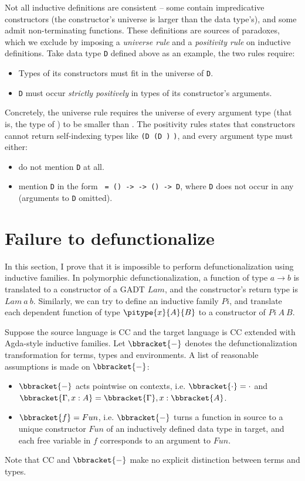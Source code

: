 Not all inductive definitions are consistent -- some contain impredicative constructors (the constructor's universe is larger than the data type's), and some admit non-terminating functions. These definitions are sources of paradoxes, which we exclude by imposing a \textit{universe rule} and a \textit{positivity rule} on inductive definitions. Take data type \texttt{D} defined above as an example, the two rules require:
\begin{itemize}
  \item Types of its constructors must fit in the universe of \texttt{D}.
  \item \texttt{D} must occur \textit{strictly positively} in types of its constructor's arguments.
\end{itemize}

Concretely, the universe rule requires the universe of every argument type  (that is, the type of ) to be smaller than . The positivity rules states that constructors cannot return self-indexing types like \texttt{(D (D \codedots )} \texttt{\codedots )}, and every argument type  must either:
\begin{itemize}
  \item do not mention \texttt{D} at all.
  \item mention \texttt{D} in the form \texttt{ = () -> \codemath{\cdots} -> () -> D}, where \texttt{D} does not occur in any  (arguments to \texttt{D} omitted).
\end{itemize}

\section{Failure to defunctionalize}

In this section, I prove that it is impossible to perform defunctionalization using inductive families. In polymorphic defunctionalization, a function of type $a \rightarrow b$ is translated to a constructor of a GADT $Lam$, and the constructor's return type is $Lam\ a\ b$. Similarly, we can try to define an inductive family $Pi$, and translate each dependent function of type $\pitype{x}{A}{B}$ to a constructor of $Pi\ A\ B$. 

Suppose the source language is CC and the target language is CC extended with Agda-style inductive families. Let $\bbracket{-}$ denotes the defunctionalization transformation for terms, types and environments. A list of reasonable assumptions is made on $\bbracket{-}$:
\begin{itemize}
  \item $\bbracket{-}$ acts pointwise on contexts, i.e. $\bbracket{\cdot} = \cdot$ and $\bbracket{\Gamma, x : A} = \bbracket{\Gamma}, x : \bbracket{A}$.
  \item $\bbracket{f} = Fun$, i.e. $\bbracket{-}$ turns a function in source to a unique constructor $Fun$ of an inductively defined data type in target, and each free variable in $f$ corresponds to an argument to $Fun$.
\end{itemize}
Note that CC and $\bbracket{-}$ make no explicit distinction between terms and types.

